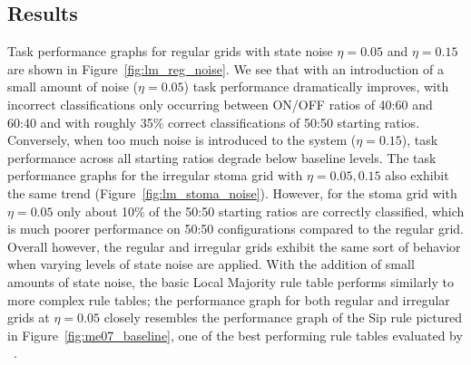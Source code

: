\documentclass[a4paper,11pt,twoside]{report}
\begin{document}
\subsection*{Results}

Task performance graphs for regular grids with state noise $\eta=0.05$ and $\eta=0.15$ are shown in Figure~\ref{fig:lm_reg_noise}. We see that with an introduction of a small amount of noise ($\eta=0.05$) task performance dramatically improves, with incorrect classifications only occurring between ON/OFF ratios of 40:60 and 60:40 and with roughly 35\% correct classifications of 50:50 starting ratios. Conversely, when too much noise is introduced to the system ($\eta=0.15$), task performance across all starting ratios degrade below baseline levels. The task performance graphs for the irregular stoma grid with $\eta=0.05, 0.15$ also exhibit the same trend (Figure~\ref{fig:lm_stoma_noise}). However, for the stoma grid with $\eta=0.05$ only about 10\% of the 50:50 starting ratios are correctly classified, which is much poorer performance on 50:50 configurations compared to the regular grid. Overall however, the regular and irregular grids exhibit the same sort of behavior when varying levels of state noise are applied. With the addition of small amounts of state noise, the basic Local Majority rule table performs similarly to more complex rule tables; the performance graph for both regular and irregular grids at $\eta=0.05$ closely resembles the performance graph of the Sip rule pictured in Figure~\ref{fig:me07_baseline}, one of the best performing rule tables evaluated by \citeauthor{me07}~\cite{me07}.
\end{document}
